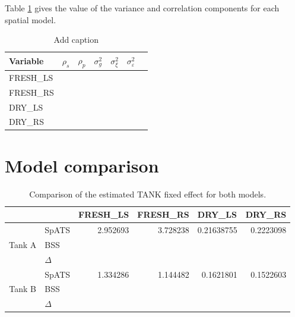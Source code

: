 %

Table \ref{tab:BSS_variance_values} gives the value of the variance and correlation components for each spatial model.

\begin{table}[htbp]
  \centering
  \caption{Add caption}
    \begin{tabular}{lrrrrrr}
    \toprule
    Variable & \multicolumn{1}{l}{$\rho_{s}$} & \multicolumn{1}{l}{$\rho_{p}$} & \multicolumn{1}{l}{$\sigma_{g}^{2}$} & \multicolumn{1}{l}{$\sigma_{\xi}^{2}$} & \multicolumn{1}{l}{$\sigma_{\varepsilon}^{2}$} &  \\
    \midrule
    FRESH\_LS &       &       &       &       &       &  \\
    FRESH\_RS &       &       &       &       &       &  \\
    DRY\_LS &       &       &       &       &       &  \\
    DRY\_RS &       &       &       &       &       &  \\
    \bottomrule
    \end{tabular}%
  \label{tab:BSS_variance_values}%
\end{table}%



\section{Model comparison}

\begin{table}[htbp]
  \centering
  \caption{Comparison of the estimated TANK fixed effect for both models.}
    \begin{tabular}{clrrrr}
    \toprule
          &       & \multicolumn{1}{l}{FRESH\_LS} & \multicolumn{1}{l}{FRESH\_RS} & \multicolumn{1}{l}{DRY\_LS} & \multicolumn{1}{l}{DRY\_RS} \\
    \midrule
    \multirow{3}[1]{*}{Tank A} 
    		& SpATS & 2.952693 & 3.728238 & 0.21638755 & 0.2223098 \\
          	& BSS   &       &       &       &  \\
          	& $\Delta$ &       &       &       &  \\
    \multirow{3}[1]{*}{Tank B} 
    		& SpATS & 1.334286  &  1.144482  &  0.1621801 &  0.1522603 \\
          	& BSS   &       &       &       &  \\
          	& $\Delta$ &       &       &       &  \\
    \bottomrule
    \end{tabular}%
  \label{tab:tank_effect_model_comparison}%
\end{table}%


